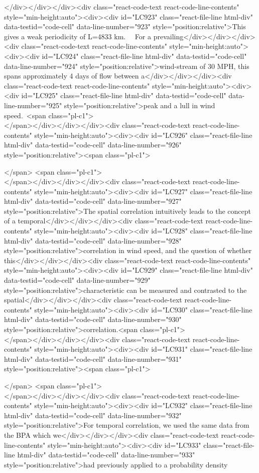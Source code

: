 {{{{{{</div></div></div><div class="react-code-text react-code-line-contents" style="min-height:auto"><div><div id="LC923" class="react-file-line html-div" data-testid="code-cell" data-line-number="923" style="position:relative">This gives a weak periodicity of L=4833 km.~~ For a prevailing</div></div></div><div class="react-code-text react-code-line-contents" style="min-height:auto"><div><div id="LC924" class="react-file-line html-div" data-testid="code-cell" data-line-number="924" style="position:relative">wind-stream of 30 MPH, this spans approximately 4 days of flow between a</div></div></div><div class="react-code-text react-code-line-contents" style="min-height:auto"><div><div id="LC925" class="react-file-line html-div" data-testid="code-cell" data-line-number="925" style="position:relative">peak and a lull in wind speed.~<span class="pl-c1">\\</span></div></div></div><div class="react-code-text react-code-line-contents" style="min-height:auto"><div><div id="LC926" class="react-file-line html-div" data-testid="code-cell" data-line-number="926" style="position:relative"><span class="pl-c1">\strut</span> <span class="pl-c1">\\</span></div></div></div><div class="react-code-text react-code-line-contents" style="min-height:auto"><div><div id="LC927" class="react-file-line html-div" data-testid="code-cell" data-line-number="927" style="position:relative">The spatial correlation intuitively leads to the concept of a temporal</div></div></div><div class="react-code-text react-code-line-contents" style="min-height:auto"><div><div id="LC928" class="react-file-line html-div" data-testid="code-cell" data-line-number="928" style="position:relative">correlation in wind speed, and the question of whether this</div></div></div><div class="react-code-text react-code-line-contents" style="min-height:auto"><div><div id="LC929" class="react-file-line html-div" data-testid="code-cell" data-line-number="929" style="position:relative">characteristic can be measured and contrasted to the spatial</div></div></div><div class="react-code-text react-code-line-contents" style="min-height:auto"><div><div id="LC930" class="react-file-line html-div" data-testid="code-cell" data-line-number="930" style="position:relative">correlation.<span class="pl-c1">\\</span></div></div></div><div class="react-code-text react-code-line-contents" style="min-height:auto"><div><div id="LC931" class="react-file-line html-div" data-testid="code-cell" data-line-number="931" style="position:relative"><span class="pl-c1">\strut</span> <span class="pl-c1">\\</span></div></div></div><div class="react-code-text react-code-line-contents" style="min-height:auto"><div><div id="LC932" class="react-file-line html-div" data-testid="code-cell" data-line-number="932" style="position:relative">For temporal correlation, we used the same data from the BPA which we</div></div></div><div class="react-code-text react-code-line-contents" style="min-height:auto"><div><div id="LC933" class="react-file-line html-div" data-testid="code-cell" data-line-number="933" style="position:relative">had previously applied to a probability density }}}}}}
